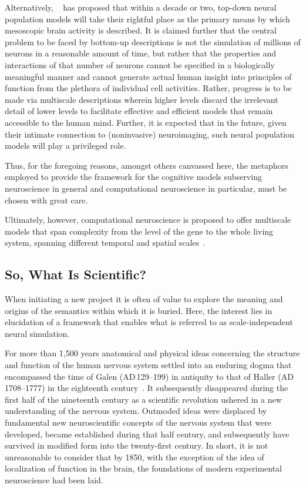 \documentclass[11pt,3p,twocolumn]{JMN}
\begin{document}
Alternatively, ~\citet{bojak22} has proposed that within a decade or two, top-down neural population models will take their rightful place as the primary means by which mesoscopic brain activity is described. It is claimed further that the central problem to be faced by bottom-up descriptions is not the simulation of millions of neurons in a reasonable amount of time, but rather that the properties and interactions of that number of neurons cannot be specified in a biologically meaningful manner and cannot generate actual human insight into principles of function from the plethora of individual cell activities. Rather, progress is to be made via multiscale descriptions wherein higher levels discard the irrelevant detail of lower levels to facilitate effective and efficient models that remain accessible to the human mind. Further, it is expected that in the future, given their intimate connection to (noninvasive) neuroimaging, such neural population models will play a privileged role.

Thus, for the foregoing reasons, amongst others canvassed here, the metaphors employed to provide the framework for the cognitive models subserving neuroscience in general and computational neuroscience in particular, must be chosen with great care.

Ultimately, however, computational neuroscience is proposed to offer multiscale models that span complexity from the level of the gene to the whole living system, spanning different temporal and spatial scales~\citep{jung22}.

\subsection{So, What Is Scientific?}

When initiating a new project it is often of value to explore the meaning and origins of the semantics within which it is buried. Here, the interest lies in elucidation of a framework that enables what is referred to as scale-independent neural simulation.

For more than 1,500 years anatomical and physical ideas concerning the structure and function of the human nervous system settled into an enduring dogma that encompassed the time of Galen ({\small{AD}}\,129--199) in antiquity to that of Haller ({\small{AD}}\,1708--1777) in the eighteenth century~\citep{clarke87}. It subsequently disappeared during the first half of the nineteenth century as a scientific revolution ushered in a new understanding of the nervous system. Outmoded ideas were displaced by fundamental new neuroscientific concepts of the nervous system that were developed, became established during that half century, and subsequently have survived in modified form into the twenty-first century. In short, it is not unreasonable to consider that by 1850, with the exception of the idea of localization of function in the brain, the foundations of modern experimental neuroscience had been laid.
\end{document}
